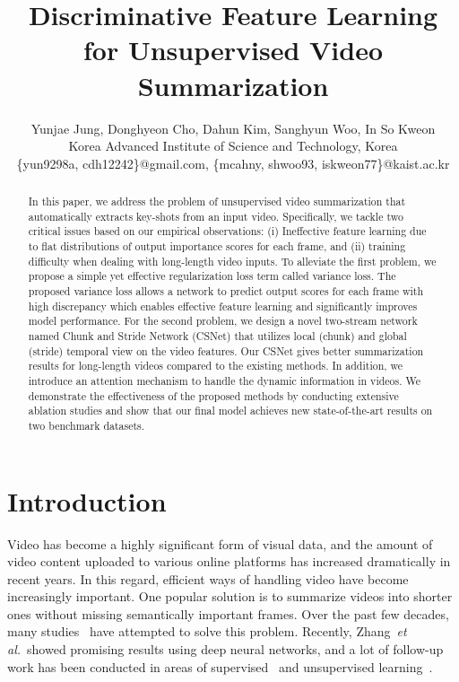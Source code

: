 \documentclass[letterpaper]{article} \usepackage{aaai19}  \usepackage{times}  \usepackage{helvet}  \usepackage{courier}  \usepackage{url}  \usepackage{graphicx}  \frenchspacing  \setlength{\pdfpagewidth}{8.5in}  \setlength{\pdfpageheight}{11in}
\newcommand{\etal}{\textit{et al.}}
\begin{document}
\title{Discriminative Feature Learning for Unsupervised Video Summarization}
\author{Yunjae Jung, Donghyeon Cho, Dahun Kim, Sanghyun Woo, In So Kweon\\
Korea Advanced Institute of Science and Technology,  Korea\\
\{yun9298a, cdh12242\}@gmail.com, \{mcahny, shwoo93, iskweon77\}@kaist.ac.kr\\
}
\maketitle
\begin{abstract}
In this paper, we address the problem of unsupervised video summarization that automatically extracts key-shots from an input video. Specifically, we tackle two critical issues based on our empirical observations: (i) Ineffective feature learning due to flat distributions of output importance scores for each frame, and (ii) training difficulty when dealing with long-length video inputs. To alleviate the first problem, we propose a simple yet effective regularization loss term called variance loss. The proposed variance loss allows a network to predict output scores for each frame with high discrepancy which enables effective feature learning and significantly improves model performance. For the second problem, we design a novel two-stream network named Chunk and Stride Network (CSNet) that utilizes local (chunk) and global (stride) temporal view on the video features. Our CSNet gives better summarization results for long-length videos compared to the existing methods. In addition, we introduce an attention mechanism to handle the dynamic information in videos. We demonstrate the effectiveness of the proposed methods by conducting extensive ablation studies and show that our final model achieves new state-of-the-art results on two benchmark datasets.







\end{abstract}




\section{Introduction}




Video has become a highly significant form of visual data, and the amount of video content uploaded to various online platforms has increased dramatically in recent years. In this regard, efficient ways of handling video have become increasingly important. One popular solution is to summarize videos into shorter ones without missing semantically important frames. Over the past few decades, many studies~\cite{song2015tvsum,ngo2003automatic,lu2013story,kim2014reconstructing,khosla2013large} have attempted to solve this problem. Recently, Zhang~\etal~showed promising results using deep neural networks, and a lot of follow-up work has been conducted in areas of supervised~\cite{zhang2016summary,zhang2016video,zhao2017hierarchical,zhao2018hsa,wei2018video} and unsupervised learning~\cite{Mahasseni2017VAEGAN,zhou2017deep}.
\end{document}
